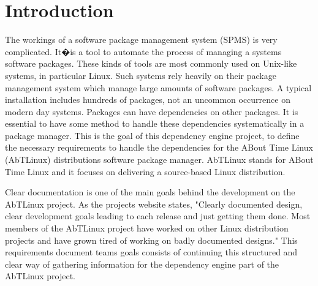 \section{Introduction}
The workings of a software package management system (SPMS) is very complicated. It�is a tool to automate the process of managing a systems software packages. These kinds of tools are most commonly used on Unix-like systems, in particular Linux. Such systems rely heavily on their package management system which manage large amounts of software packages. A typical installation includes hundreds of packages, not an uncommon occurrence on modern day systems. Packages can have dependencies on other packages. It is essential to have some method to handle these dependencies systematically in a package manager. This is the goal of this dependency engine project, to define the necessary requirements to handle the dependencies for the ABout Time Linux (AbTLinux) distributions software package manager. AbTLinux stands for ABout Time Linux and it focuses on delivering a source-based Linux distribution.

Clear documentation is one of the main goals behind the development on the AbTLinux project. As the projects website states, "Clearly documented design, clear development goals leading to each release and just getting them done. Most members of the AbTLinux project have worked on other Linux distribution projects and have grown tired of working on badly documented designs." \cite{schabell2005abtlinux} This requirements document teams goals consists of continuing this structured and clear way of gathering information for the dependency engine part of the AbTLinux project.

